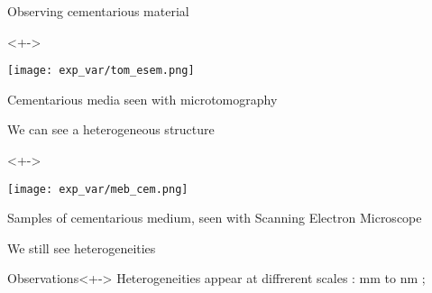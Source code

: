 
\begin{frame}{Observing cementarious material}
%
\begin{block}{}<+->%
\begin{multicols}{2}
\texttt{[image: exp\_var/tom\_esem.png]}

\columnbreak
Cementarious media seen with microtomography

\par
We can see a heterogeneous structure
\end{multicols}
\end{block}
%
\begin{block}{}<+->%
\begin{multicols}{2}
\texttt{[image: exp\_var/meb\_cem.png]}

\columnbreak
Samples of cementarious medium, seen with Scanning Electron Microscope

\par
We still see heterogeneities
\end{multicols}
\end{block}
%
\begin{block}{Observations}<+->
Heterogeneities appear at diffrerent scales : mm to nm ;
\end{block}
%
\end{frame}

